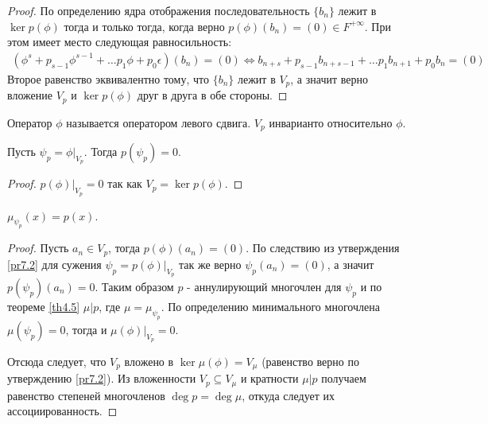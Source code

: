 \begin{proof}
    По определению ядра отображения последовательность $\{b_n\}$ лежит в $\ker p(\phi)$ тогда 
    и только тогда, когда верно $p(\phi) (b_n) = (0) \in F^{+\infty}$. При этом имеет место 
    следующая равносильность:
    \begin{eqnarray*}
        (\phi^s + p_{s-1} \phi^{s-1} + \dots p_1 \phi + p_0 \epsilon) (b_n) = (0) \Leftrightarrow
        b_{n+s} + p_{s-1} b_{n+s-1} + \dots p_1 b_{n+1} + p_0 b_n = (0)
    \end{eqnarray*}
    Второе равенство эквивалентно тому, что $\{b_n\}$ лежит в $V_p$, а значит верно вложение $V_p$ и 
    $\ker p(\phi)$ друг в друга в обе стороны.
\end{proof}

\begin{note}
    Оператор $\phi$ называется оператором левого сдвига. $V_p$ инварианто относительно $\phi$.
\end{note}

\begin{corollary}
    Пусть $\psi_p = \phi \vert_{V_p}$. Тогда $p(\psi_p) = 0$.
\end{corollary}

\begin{proof}
    $p(\phi) \vert_{V_p} = 0$ так как $V_p = \ker p(\phi)$.
\end{proof}

\begin{proposition}
    $\mu_{\psi_p} (x) = p(x)$.
\end{proposition}

\begin{proof}
    Пусть $a_n \in V_p$, тогда $p(\phi) (a_n) = (0)$. По следствию из утверждения \ref{pr7.2} 
    для сужения $\psi_p = p(\phi) \vert_{V_p}$ так же верно $\psi_p (a_n) = (0)$, а
    значит $p(\psi_p) (a_n) = 0$. Таким образом $p$ - аннулирующий многочлен для $\psi_p$ и по 
    теореме \ref{th4.5} $\mu \vert p$, где $\mu = \mu_{\psi_p}$.
    По определению минимального многочлена $\mu(\psi_p) = 0$, тогда и $\mu(\phi) \vert_{V_p} = 0$.

    Отсюда следует, что $V_p$ вложено в $\ker \mu(\phi) = V_{\mu}$ (равенство верно по утверждению 
    \ref{pr7.2}). Из вложенности $V_p \subseteq V_{\mu}$ и кратности $\mu \vert p$ получаем 
    равенство степеней многочленов $\deg p = \deg \mu$, откуда следует их ассоциированность.
\end{proof}

